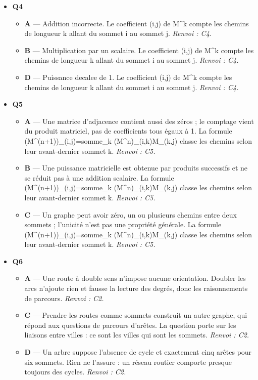 \begin{itemize}
\begin{itemize}
    \item \textbf{D} — La somme d'une ligne est le degré du sommet correspondant, qui n'est généralement pas égal à 1. La matrice d'adjacence d'un graphe simple non orienté est symétrique et sa diagonale est nulle. \emph{Renvoi : C3.}
  \end{itemize}
  \item \textbf{Q4}
  \begin{itemize}
    \item \textbf{A} — Addition incorrecte. Le coefficient (i,j) de M\textasciicircum{}k compte les chemins de longueur k allant du sommet i au sommet j. \emph{Renvoi : C4.}
    \item \textbf{B} — Multiplication par un scalaire. Le coefficient (i,j) de M\textasciicircum{}k compte les chemins de longueur k allant du sommet i au sommet j. \emph{Renvoi : C4.}
    \item \textbf{D} — Puissance decalee de 1. Le coefficient (i,j) de M\textasciicircum{}k compte les chemins de longueur k allant du sommet i au sommet j. \emph{Renvoi : C4.}
  \end{itemize}
  \item \textbf{Q5}
  \begin{itemize}
    \item \textbf{A} — Une matrice d'adjacence contient aussi des zéros ; le comptage vient du produit matriciel, pas de coefficients tous égaux à 1. La formule (M\textasciicircum{}(n+1))\_(i,j)=somme\_k (M\textasciicircum{}n)\_(i,k)M\_(k,j) classe les chemins selon leur avant-dernier sommet k. \emph{Renvoi : C5.}
    \item \textbf{B} — Une puissance matricielle est obtenue par produits successifs et ne se réduit pas à une addition scalaire. La formule (M\textasciicircum{}(n+1))\_(i,j)=somme\_k (M\textasciicircum{}n)\_(i,k)M\_(k,j) classe les chemins selon leur avant-dernier sommet k. \emph{Renvoi : C5.}
    \item \textbf{C} — Un graphe peut avoir zéro, un ou plusieurs chemins entre deux sommets ; l'unicité n'est pas une propriété générale. La formule (M\textasciicircum{}(n+1))\_(i,j)=somme\_k (M\textasciicircum{}n)\_(i,k)M\_(k,j) classe les chemins selon leur avant-dernier sommet k. \emph{Renvoi : C5.}
  \end{itemize}
  \item \textbf{Q6}
  \begin{itemize}
    \item \textbf{A} — Une route à double sens n'impose aucune orientation. Doubler les arcs n'ajoute rien et fausse la lecture des degrés, donc les raisonnements de parcours. \emph{Renvoi : C2.}
    \item \textbf{C} — Prendre les routes comme sommets construit un autre graphe, qui répond aux questions de parcours d'arêtes. La question porte sur les liaisons entre villes : ce sont les villes qui sont les sommets. \emph{Renvoi : C2.}
    \item \textbf{D} — Un arbre suppose l'absence de cycle et exactement cinq arêtes pour six sommets. Rien ne l'assure : un réseau routier comporte presque toujours des cycles. \emph{Renvoi : C2.}
  \end{itemize}
\end{itemize}
\fi
